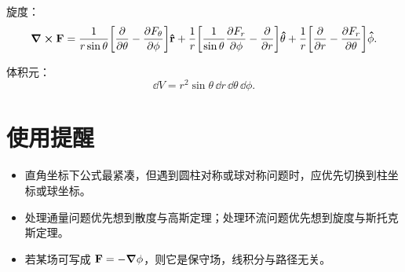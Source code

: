 旋度：
\[
\curl \vb{F}=
\frac{1}{r\sin\theta}\qty[\pdv{}{\theta}(\sin\theta\,F_{\phi})-\pdv{F_{\theta}}{\phi}]\vu{r}
+\frac{1}{r}\qty[\frac{1}{\sin\theta}\pdv{F_r}{\phi}-\pdv{}{r}(rF_{\phi})]\vu{\theta}
+\frac{1}{r}\qty[\pdv{}{r}(rF_{\theta})-\pdv{F_r}{\theta}]\vu{\phi}.
\]

体积元：
\[
\dd V=r^2\sin\theta\,\dd r\,\dd\theta\,\dd\phi.
\]

\section{使用提醒}

\begin{itemize}
  \item 直角坐标下公式最紧凑，但遇到圆柱对称或球对称问题时，应优先切换到柱坐标或球坐标。
  \item 处理通量问题优先想到散度与高斯定理；处理环流问题优先想到旋度与斯托克斯定理。
  \item 若某场可写成 $\vb{F}=-\grad \phi$，则它是保守场，线积分与路径无关。
\end{itemize}
